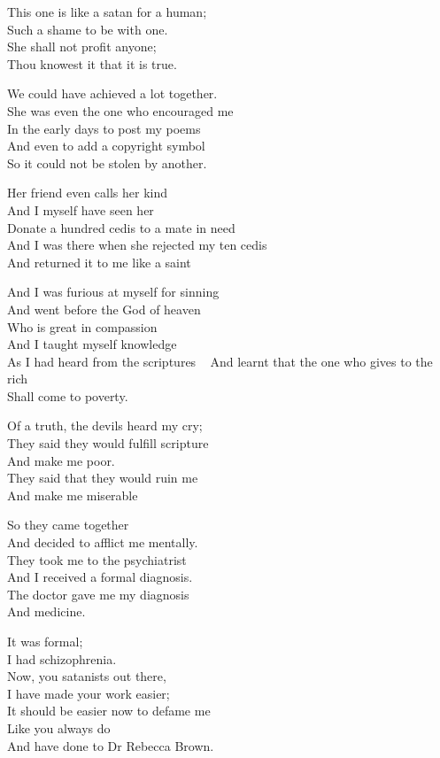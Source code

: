 \documentclass[
]{book}
\begin{document}
This one is like a satan for a human;\\
Such a shame to be with one.\\
She shall not profit anyone;\\
Thou knowest it that it is true.

We could have achieved a lot together.\\
She was even the one who encouraged me\\
In the early days to post my poems\\
And even to add a copyright symbol\\
So it could not be stolen by another.

Her friend even calls her kind\\
And I myself have seen her\\
Donate a hundred cedis to a mate in need\\
And I was there when she rejected my ten cedis\\
And returned it to me like a saint

And I was furious at myself for sinning\\
And went before the God of heaven\\
Who is great in compassion\\
And I taught myself knowledge\\
As I had heard from the scriptures ~
And learnt that the one who gives to the rich\\
Shall come to poverty.

Of a truth, the devils heard my cry;\\
They said they would fulfill scripture\\
And make me poor.\\
They said that they would ruin me\\
And make me miserable

So they came together\\
And decided to afflict me mentally.\\
They took me to the psychiatrist\\
And I received a formal diagnosis.\\
The doctor gave me my diagnosis\\
And medicine.

It was formal;\\
I had schizophrenia.\\
Now, you satanists out there,\\
I have made your work easier;\\
It should be easier now to defame me\\
Like you always do\\
And have done to Dr Rebecca Brown.
\end{document}

